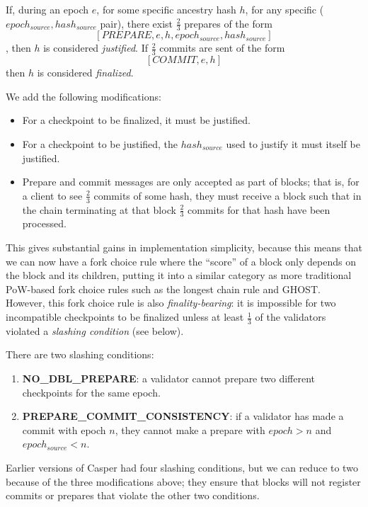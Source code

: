 \documentclass[12pt]{article}
\begin{document}
If, during an epoch $e$, for some specific ancestry hash $h$, for any specific ($epoch_{source}, hash_{source}$ pair), there exist $\frac{2}{3}$ prepares of the form $$[PREPARE, e, h, epoch_{source}, hash_{source}]$$, then $h$ is considered \textit{justified}. If $\frac{2}{3}$ commits are sent of the form $$[COMMIT, e, h]$$ then $h$ is considered \textit{finalized}.

We add the following modifications:

\begin{itemize}
\item For a checkpoint to be finalized, it must be justified.
\item For a checkpoint to be justified, the $hash_{source}$ used to justify it must itself be justified.
\item Prepare and commit messages are only accepted as part of blocks; that is, for a client to see $\frac{2}{3}$ commits of some hash, they must receive a block such that in the chain terminating at that block $\frac{2}{3}$ commits for that hash have been processed.
\end{itemize}

This gives substantial gains in implementation simplicity, because this means that we can now have a fork choice rule where the ``score'' of a block only depends on the block and its children, putting it into a similar category as more traditional PoW-based fork choice rules such as the longest chain rule and GHOST. However, this fork choice rule is also \textit{finality-bearing}: it is impossible for two incompatible checkpoints to be finalized unless at least $\frac{1}{3}$ of the validators violated a \textit{slashing condition} (see below).

There are two slashing conditions:

\begin{enumerate}
\item \textbf{NO\_DBL\_PREPARE}: a validator cannot prepare two different checkpoints for the same epoch.
\item \textbf{PREPARE\_COMMIT\_CONSISTENCY}: if a validator has made a commit with epoch $n$, they cannot make a prepare with $epoch > n$ and $epoch_{source} < n$.
\end{enumerate}

Earlier versions of Casper had four slashing conditions, but we can reduce to two because of the three modifications above; they ensure that blocks will not register commits or prepares that violate the other two conditions.
\end{document}
